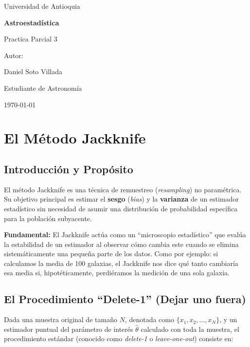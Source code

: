 \documentclass[a4paper]{article}
\begin{document}
\begin{titlepage}
  \centering
  {\Large Universidad de Antioquia\par}
  \vspace{2cm}
  {\huge\bfseries Astroestadística\par}
  \vspace{0.4cm}
  {\Large Practica Parcial 3 \par}
  \vspace{2.5cm}
  {\large Autor:\par}
  \vspace{0.2cm}
  {\large Daniel Soto Villada\par}
  {\large Estudiante de Astronomía\par}
  \vfill
  {\large \today\par}
\end{titlepage}

\newpage
\tableofcontents
\newpage

\section{El Método Jackknife}

\subsection{Introducción y Propósito}
El método Jackknife es una técnica de remuestreo (\textit{resampling}) no paramétrica. Su objetivo principal es estimar el \textbf{sesgo} (\textit{bias}) y la \textbf{varianza} de un estimador estadístico sin necesidad de asumir una distribución de probabilidad específica para la población subyacente. 

\textbf{Fundamental:} El Jackknife actúa como un ``microscopio estadístico'' que evalúa la estabilidad de un estimador al observar cómo cambia este cuando se elimina sistemáticamente una pequeña parte de los datos. Como por ejemplo: si calculamos la media de 100 galaxias, el Jackknife nos dice qué tanto cambiaría esa media si, hipotéticamente, perdiéramos la medición de una sola galaxia.

\subsection{El Procedimiento ``Delete-1'' (Dejar uno fuera)}
Dada una muestra original de tamaño $N$, denotada como $\{x_1, x_2, \dots, x_N\}$, y un estimador puntual del parámetro de interés $\hat{\theta}$ calculado con toda la muestra, el procedimiento estándar (conocido como \textit{delete-1} o \textit{leave-one-out}) consiste en:
\end{document}
